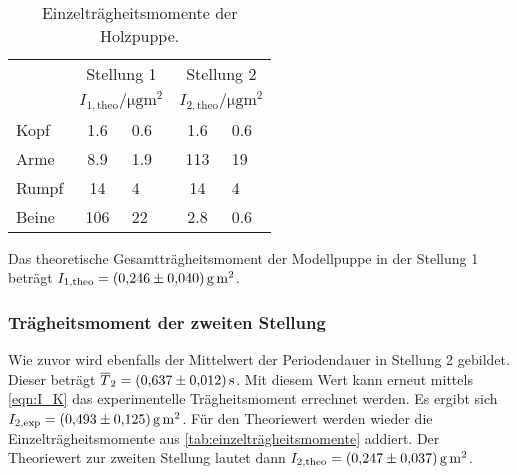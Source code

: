 \begin{table}
  \centering
  \caption{Einzelträgheitsmomente der Holzpuppe.} 
  \label{tab:einzelträgheitsmomente}
  \begin{tabular}{l c @{${}\pm{}$} l c @{${}\pm{}$} l}
      \toprule
      & \multicolumn{2}{c}{Stellung 1} & \multicolumn{2}{c}{Stellung 2} \\
      \cmidrule(lr){2-3}\cmidrule(lr){4-5}
       & \multicolumn{2}{c}{$\unit{I_{1,\text{theo}}\per\micro\gram\metre\squared}$} & \multicolumn{2}{c}{$\unit{I_{2,\text{theo}}\per\micro\gram\metre\squared}$} \\
      \midrule
      {Kopf} & 1.6 & 0.6 & 1.6 & 0.6 \\
      {Arme} & 8.9 & 1.9 & 113 & 19 \\
      {Rumpf} & 14 & 4 & 14 & 4 \\
      {Beine} & 106 & 22 & 2.8 & 0.6 \\
      \bottomrule 
  \end{tabular}
\end{table}
Das theoretische Gesamtträgheitsmoment der Modellpuppe in der Stellung 1 beträgt $I_{1\text{,theo}} = \qty{0.246+-0.040}{\gram\metre\squared}$.
\subsubsection{Trägheitsmoment der zweiten Stellung}
\label{subsubsec:A_tpose}
Wie zuvor wird ebenfalls der Mittelwert der Periodendauer in Stellung 2 gebildet. Dieser beträgt $\overline{T}_2 = \qty{0.637+-0.012}{\second}$. Mit diesem Wert kann erneut mittels \autoref{eqn:I_K}
das experimentelle Trägheitsmoment errechnet werden. Es ergibt sich $I_{2\text{,exp}} = \qty{0.493+-0.125}{\gram\metre\squared}$. Für den Theoriewert werden wieder die Einzelträgheitsmomente aus 
\autoref{tab:einzelträgheitsmomente} addiert. Der Theoriewert zur zweiten Stellung lautet dann $I_{2\text{,theo}} = \qty{0.247+-0.037}{\gram\metre\squared}$.
